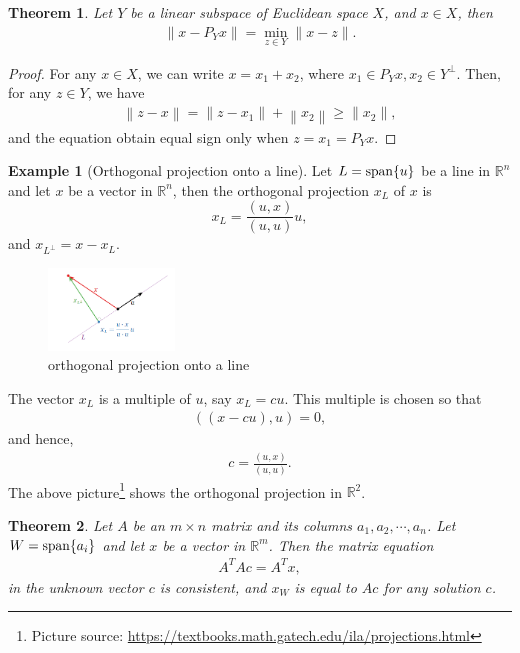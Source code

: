 \documentclass[10pt]{book}
\newtheorem{theorem}{Theorem}[chapter]
\theoremstyle{definition}
\newtheorem{example}{Example}[chapter]
\numberwithin{equation}{chapter}
\begin{document}
\medskip

\begin{theorem}
Let $Y$ be a linear subspace of Euclidean space $X$, and $x\in X$, then 
\begin{align*}
    \left\|x - P_Y x \right\| = \min_{z\in Y} \|x - z\|.
\end{align*}
\end{theorem}
\begin{proof}
For any $x\in X$, we can write $x = x_1 + x_2$, where $x_1\in P_Y x, x_2\in Y^\perp$. Then, for any $z\in Y$, we have
\begin{align*}
    \left\|z - x\right\| = \|z - x_1\| +  \left\|x_2\right\| \geq \|x_2\|,
\end{align*}
and the equation obtain equal sign only when $z = x_1 = P_Y x$.
\end{proof}

\medskip

\begin{example}[Orthogonal projection onto a line]\label{Orthogonal projection onto a line}
Let $L = {\rm span}\{u\}$ be a line in $\mathbb{R}^n$ and let $x$ be a vector in $\mathbb{R}^n$, then the orthogonal projection $x_L$ of $x$ is $$x_L = \frac{(u,x)}{(u,u)}u,$$
and $x_{L^\bot} = x - x_L$.
\begin{figure}[H]
    \centering
    \includegraphics[width=0.3\textwidth]{Orthogonal_projection_1}
    \caption{orthogonal projection onto a line}
    \label{fig:plot_1}
\end{figure}
The vector $x_L$ is a multiple of $u$, say $x_L = cu$. This multiple is chosen so that 
\begin{align*}
    ((x - cu), u) = 0,
\end{align*}
and hence,
\begin{align*}
    c = \frac{(u, x)}{(u, u)}.
\end{align*}
The above picture\footnote{Picture source: \url{https://textbooks.math.gatech.edu/ila/projections.html}} shows the orthogonal projection in $\mathbb{R}^2$.
\end{example}

\medskip

\begin{theorem}
Let $A$ be an $m \times n$ matrix and its columns $a_1, a_2, \cdots, a_n$. Let $W = {\rm span}\{a_i\}$ and let $x$ be a vector in $\mathbb{R}^m$. Then the matrix equation
\begin{align*}
    A^T Ac = A^T x,
\end{align*}
in the unknown vector $c$ is consistent, and $x_W$ is equal to $Ac$ for any solution $c$.
\end{theorem}
\end{document}
